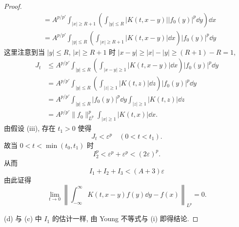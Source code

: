 \begin{proof}
\begin{align*}
&= A^{p/p'}\int_{|x| \geq R + 1}\left(\int_{|y| \leq R} |K(t, x - y)||f_{0}(y)|^{p}\dd y\right)\dd x \\
&= A^{p/p'}\int_{|y| \leq R}\left(\int_{|x| \geq R + 1} |K(t, x - y)|\dd x\right)|f_{0}(y)|^{p}\dd y
\end{align*}
这里注意到当 $|y| \leq R$, $|x| \geq R+1$ 时 $|x-y| \geq |x| - |y| \geq (R+1) - R = 1$, 
\begin{align*}
J_{t} &\leq A^{p/p'}\int_{|y| \leq R}\left(\int_{|x - y| \geq 1} |K(t, x - y)|\dd x\right)|f_{0}(y)|^{p}\dd y \\
&= A^{p/p'}\int_{|y| \leq R}\left(\int_{|z| \geq 1} |K(t, z)|\dd z\right)|f_{0}(y)|^{p}\dd y \\
&= A^{p/p'}\int_{|y| \leq R} |f_{0}(y)|^{p}\dd y \int_{|z| \geq 1} |K(t, z)|\dd z \\
&= A^{p/p'}\| f_{0} \|_{L^{p}}^{p}\int_{|x| \geq 1} |K(t, x)|\dd x.
\end{align*}
由假设 (iii), 存在 $t_{1} > 0$ 使得
\begin{equation*}
J_{t} < \varepsilon^{p} \quad (0 < t < t_{1}).
\end{equation*}
故当 $0 < t < \min(t_{0}, t_{1})$ 时
\begin{equation*}
I_{2}^{p} < \varepsilon^{p} + \varepsilon^{p} < (2\varepsilon)^{p}.
\end{equation*}
从而
\begin{equation*}
I_{1} + I_{2} + I_{3} < (A + 3)\varepsilon
\end{equation*}
由此证得
\begin{equation*}
\lim_{t \rightarrow 0}\left\| \int_{-\infty}^{\infty} K(t, x - y)f(y)\dd y - f(x) \right\|_{L^{p}} = 0.
\end{equation*}

(d) 与 (c) 中 $I_{1}$ 的估计一样, 由 Young 不等式与 (i) 即得结论.
\end{proof}

